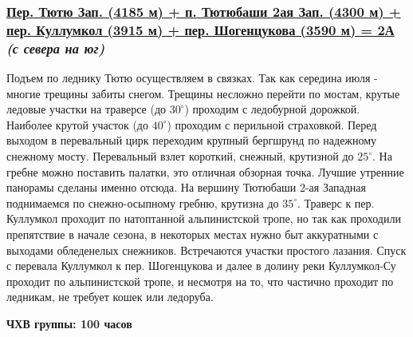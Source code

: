 		\subsubsection*{%
			\hyperref[subsec:Day17]{Пер. Тютю Зап. (4185 м) + п. Тютюбаши 2ая Зап. (4300 м) + пер. Куллумкол (3915 м) + пер. Шогенцукова (3590 м) = 2А}
			{\it (с севера на юг)}%
		}
			Подъем по леднику Тютю осуществляем в связках. Так как середина июля - многие трещины забиты снегом.
			Трещины несложно перейти по мостам, крутые ледовые участки на траверсе (до $30^\circ$) проходим с
			ледобурной дорожкой. Наиболее крутой участок (до $40^\circ$) проходим с перильной страховкой. Перед
			выходом в перевальный цирк переходим крупный бергшрунд по надежному снежному мосту. Перевальный взлет
			короткий, снежный, крутизной до $25^\circ$. На гребне можно поставить палатки, это отличная обзорная
			точка. Лучшие утренние панорамы сделаны именно отсюда. На вершину Тютюбаши 2-ая Западная поднимаемся
			по снежно-осыпному гребню, крутизна до $35^\circ$. Траверс к пер. Куллумкол проходит по натоптанной
			альпинистской тропе, но так как проходили препятствие в начале сезона, в некоторых местах нужно быт
			аккуратными с выходами обледенелых снежников. Встречаются участки простого лазания. Спуск с перевала
			Куллумкол к пер. Шогенцукова и далее в долину реки Куллумкол-Су проходит по альпинистской тропе, и
			несмотря на то, что частично проходит по ледникам, не требует кошек или ледоруба.

			{\bf ЧХВ группы: 100 часов}

